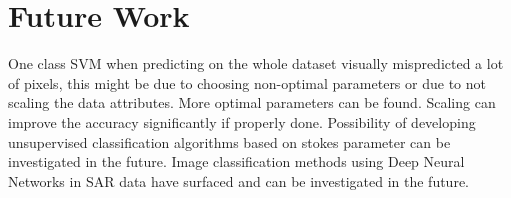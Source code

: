 
\chapter{Future Work} %

\label{Chapter6} %



One class SVM when predicting on the whole dataset visually mispredicted a lot of pixels, this might be due to choosing non-optimal parameters or due to not scaling the data attributes. More optimal parameters can be found. Scaling can improve the accuracy significantly if properly done. Possibility of developing unsupervised classification algorithms based on stokes parameter can be investigated in the future. Image classification methods using Deep Neural Networks in SAR data have surfaced and can be investigated in the future. 